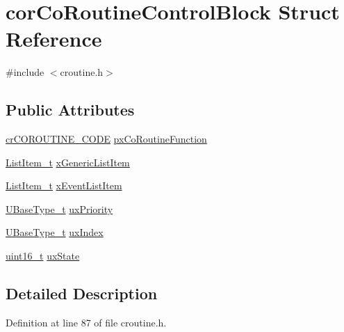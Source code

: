 \hypertarget{structcor_co_routine_control_block}{}\section{cor\+Co\+Routine\+Control\+Block Struct Reference}
\label{structcor_co_routine_control_block}


{\ttfamily \#include $<$croutine.\+h$>$}

\subsection*{Public Attributes}
\begin{DoxyCompactItemize}
\item 
\hyperlink{croutine_8h_a397a7505718dd366d8411ce324c49758}{cr\+C\+O\+R\+O\+U\+T\+I\+N\+E\+\_\+\+C\+O\+DE} \hyperlink{structcor_co_routine_control_block_acc98c7364cd88e8e034a5f9bba113832}{px\+Co\+Routine\+Function}
\item 
\hyperlink{list_8h_a1a62d469392f9bfe2443e7efab9c8398}{List\+Item\+\_\+t} \hyperlink{structcor_co_routine_control_block_aa2900494db8782eeb8ef12d482501406}{x\+Generic\+List\+Item}
\item 
\hyperlink{list_8h_a1a62d469392f9bfe2443e7efab9c8398}{List\+Item\+\_\+t} \hyperlink{structcor_co_routine_control_block_a105d316da0069f766acc3b210afed1b9}{x\+Event\+List\+Item}
\item 
\hyperlink{_g_c_c_2_a_r_m___c_m3_2portmacro_8h_a646f89d4298e4f5afd522202b11cb2e6}{U\+Base\+Type\+\_\+t} \hyperlink{structcor_co_routine_control_block_a752101a5d41b5caa7fd5149436613c8f}{ux\+Priority}
\item 
\hyperlink{_g_c_c_2_a_r_m___c_m3_2portmacro_8h_a646f89d4298e4f5afd522202b11cb2e6}{U\+Base\+Type\+\_\+t} \hyperlink{structcor_co_routine_control_block_a6c185cd2145f562fb570bea9b158fc81}{ux\+Index}
\item 
\hyperlink{_p_e___types_8h_a1f1825b69244eb3ad2c7165ddc99c956}{uint16\+\_\+t} \hyperlink{structcor_co_routine_control_block_aa0d702ff5a23c61598fe13e5a78fb1dc}{ux\+State}
\end{DoxyCompactItemize}


\subsection{Detailed Description}


Definition at line 87 of file croutine.\+h.



